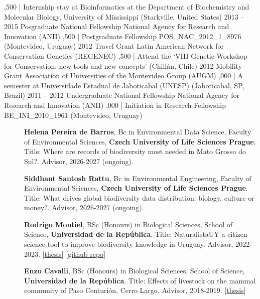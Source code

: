 \documentclass[9pt]{developercv} %
\begin{document}
\begin{entrylist}
		{,500 | Internship stay at Bioinformatics at the Department of Biochemistry and Molecular Biology, University of Mississippi (Starkville, United States)}
	\entry
		{2013 -- 2015}
		{Posgraduate National Fellowship}
		{National Agency for Research and Innovation (ANII)}
		{,500 | Postgraduate Fellowship POS\_NAC\_2012\_1\_8976 (Montevideo, Uruguay)}
	\entry
		{2012}
		{Travel Grant}
		{Latin American Network for Conservation Genetics (REGENEC)}
		{,500 | Attend the ‘VIII Genetic Workshop for Conservation: new tools and new concepts’ (Chillán, Chile)}
	\entry
		{2012}
		{Mobility Grant}
		{Association of Universities of the Montevideo Group (AUGM)}
		{,000 | A semester at Universidade Estadual de Jaboticabal (UNESP) (Jaboticabal, SP, Brazil)}
	\entry
		{2011 -- 2012}
		{Undergraduate National Fellowship}
		{National Agency for Research and Innovation (ANII)}
		{,000 | Initiation in Research Fellowship BE\_INI\_2010\_1961 (Montevideo, Uruguay)}

\end{entrylist}




\begin{description}
\item[]{\bf Helena Pereira de Barros}, Bc in Environmental Data Science, Faculty of Environmental Sciences, {\bf Czech University of Life Sciences Prague}. Title: Where are records of biodiversity most needed in Mato Grosso do Sul?. Advisor, 2026-2027 (ongoing). 
\item[]{\bf Siddhant Santosh Rattu}, Bc in Environmental Engineering, Faculty of Environmental Sciences, {\bf Czech University of Life Sciences Prague}. Title: What drives global biodiversity data distribution: biology, culture or money?. Advisor, 2026-2027 (ongoing). 
\item[]{\bf Rodrigo Montiel}, BSc (Honours) in Biological Sciences, School of Science, {\bf Universidad de la Rep\'{u}blica}. Title: NaturalistaUY a citizen science tool to improve biodiversity knowledge in Uruguay. Advisor, 2022-2023. [\href{https://www.colibri.udelar.edu.uy/jspui/bitstream/20.500.12008/42167/1/uy24-20995.pdf}{thesis}] [\href{https://github.com/Rodrigo-Montiel/TesisNaturalistaUY}{github repo}]
\item[]{\bf Enzo Cavalli}, BSc (Honours) in Biological Sciences, School of Science, {\bf Universidad de la Rep\'{u}blica}. Title: Effects of livestock on the mammal community of Paso Centurión, Cerro Largo. Advisor, 2018-2019.  [\href{https://www.colibri.udelar.edu.uy/jspui/bitstream/20.500.12008/23484/6/uy24-19703.pdf}{thesis}]
\end{description}
\end{document}
